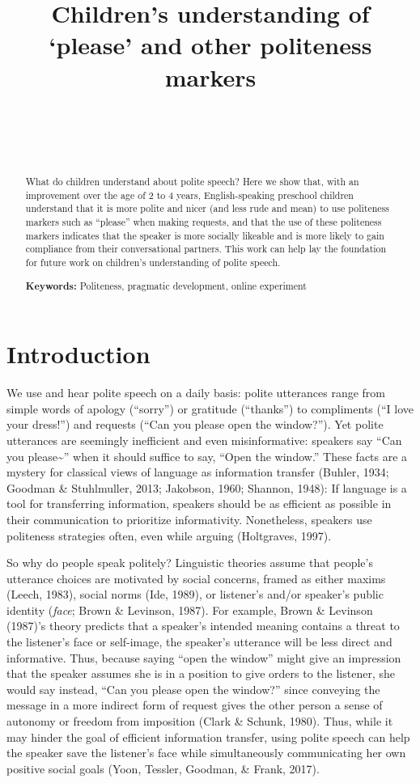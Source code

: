 \documentclass[10pt, letterpaper]{article}
\title{Children's understanding of `please' and other politeness markers}
\author{{\large \bf } \\ \texttt{} \\  \\}
\begin{document}
\maketitle

\begin{abstract}
What do children understand about polite speech? Here we show that, with
an improvement over the age of 2 to 4 years, English-speaking preschool
children understand that it is more polite and nicer (and less rude and
mean) to use politeness markers such as ``please'' when making requests,
and that the use of these politeness markers indicates that the speaker
is more socially likeable and is more likely to gain compliance from
their conversational partners. This work can help lay the foundation for
future work on children's understanding of polite speech.

\textbf{Keywords:}
Politeness, pragmatic development, online experiment
\end{abstract}

\section{Introduction}\label{introduction}

We use and hear polite speech on a daily basis: polite utterances range
from simple words of apology (``sorry'') or gratitude (``thanks'') to
compliments (``I love your dress!'') and requests (``Can you please open
the window?''). Yet polite utterances are seemingly inefficient and even
misinformative: speakers say ``Can you please\textasciitilde{}'' when it
should suffice to say, ``Open the window.'' These facts are a mystery
for classical views of language as information transfer (Buhler, 1934;
Goodman \& Stuhlmuller, 2013; Jakobson, 1960; Shannon, 1948): If
language is a tool for transferring information, speakers should be as
efficient as possible in their communication to prioritize
informativity. Nonetheless, speakers use politeness strategies often,
even while arguing (Holtgraves, 1997).

So why do people speak politely? Linguistic theories assume that
people's utterance choices are motivated by social concerns, framed as
either maxims (Leech, 1983), social norms (Ide, 1989), or listener's
and/or speaker's public identity (\emph{face}; Brown \& Levinson, 1987).
For example, Brown \& Levinson (1987)'s theory predicts that a speaker's
intended meaning contains a threat to the listener's face or self-image,
the speaker's utterance will be less direct and informative. Thus,
because saying ``open the window'' might give an impression that the
speaker assumes she is in a position to give orders to the listener, she
would say instead, ``Can you please open the window?'' since conveying
the message in a more indirect form of request gives the other person a
sense of autonomy or freedom from imposition (Clark \& Schunk, 1980).
Thus, while it may hinder the goal of efficient information transfer,
using polite speech can help the speaker save the listener's face while
simultaneously communicating her own positive social goals (Yoon,
Tessler, Goodman, \& Frank, 2017).
\end{document}
